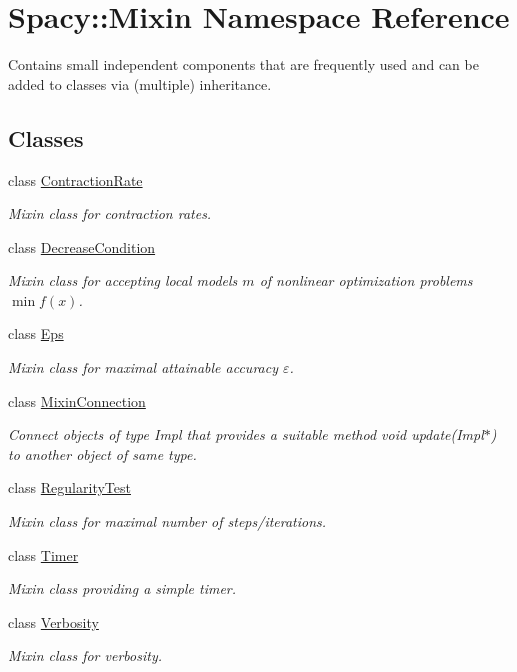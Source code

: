 \hypertarget{namespaceSpacy_1_1Mixin}{\section{Spacy\-:\-:Mixin Namespace Reference}
\label{namespaceSpacy_1_1Mixin}
}


Contains small independent components that are frequently used and can be added to classes via (multiple) inheritance.  


\subsection*{Classes}
\begin{DoxyCompactItemize}
\item 
class \hyperlink{classSpacy_1_1Mixin_1_1ContractionRate}{Contraction\-Rate}
\begin{DoxyCompactList}\small\item\em Mixin class for contraction rates. \end{DoxyCompactList}\item 
class \hyperlink{classSpacy_1_1Mixin_1_1DecreaseCondition}{Decrease\-Condition}
\begin{DoxyCompactList}\small\item\em Mixin class for accepting local models $m$ of nonlinear optimization problems $\min f(x)$. \end{DoxyCompactList}\item 
class \hyperlink{classSpacy_1_1Mixin_1_1Eps}{Eps}
\begin{DoxyCompactList}\small\item\em Mixin class for maximal attainable accuracy $\varepsilon$. \end{DoxyCompactList}\item 
class \hyperlink{classSpacy_1_1Mixin_1_1MixinConnection}{Mixin\-Connection}
\begin{DoxyCompactList}\small\item\em Connect objects of type Impl that provides a suitable method void update(\-Impl$\ast$) to another object of same type. \end{DoxyCompactList}\item 
class \hyperlink{classSpacy_1_1Mixin_1_1RegularityTest}{Regularity\-Test}
\begin{DoxyCompactList}\small\item\em Mixin class for maximal number of steps/iterations. \end{DoxyCompactList}\item 
class \hyperlink{classSpacy_1_1Mixin_1_1Timer}{Timer}
\begin{DoxyCompactList}\small\item\em Mixin class providing a simple timer. \end{DoxyCompactList}\item 
class \hyperlink{classSpacy_1_1Mixin_1_1Verbosity}{Verbosity}
\begin{DoxyCompactList}\small\item\em Mixin class for verbosity. \end{DoxyCompactList}\end{DoxyCompactItemize}


